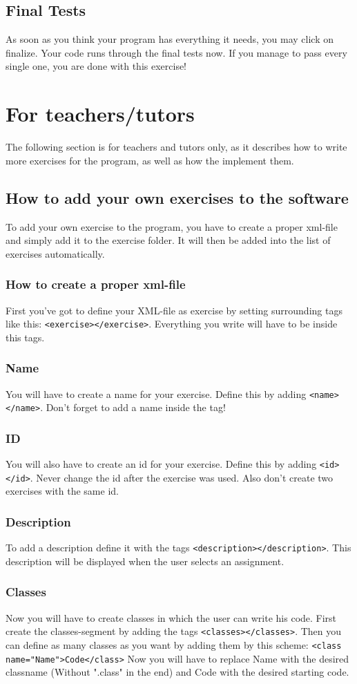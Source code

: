 \documentclass[10pt,a4paper]{article}
\begin{document}
\subsection{Final Tests}
As soon as you think your program has everything it needs, you may click on finalize. Your code runs through the final tests now. If you manage to pass every single one, you are done with this exercise!
\section{For teachers/tutors}
The following section is for teachers and tutors only, as it describes how to write more exercises for the program, as well as how the implement them.
\subsection{How to add your own exercises to the software}
To add your own exercise to the program, you have to create a proper xml-file and simply add it to the exercise folder. It will then be added into the list of exercises automatically.
\subsubsection{How to create a proper xml-file}
First you've got to define your XML-file as exercise by setting surrounding tags like this: 
\texttt{<exercise></exercise>}. Everything you write will have to be inside this tags.
\subsubsection{Name}
You will have to create a name for your exercise. Define this by adding \texttt{<name></name>}. Don't forget to add a name inside the tag!
\subsubsection{ID}
You will also have to create an id for your exercise. Define this by adding \texttt{<id></id>}. Never change the id  after the exercise was used. Also don't create two exercises with the same id.
\subsubsection{Description}
To add a description define it with the tags \texttt{<description></description>}. This description will be displayed when the user selects an assignment.
\subsubsection{Classes}
Now you will have to create classes in which the user can write his code. First create the classes-segment by adding the tags \texttt{<classes></classes>}. \newline
Then you can define as many classes as you want by adding them by this scheme: \newline
\texttt{<class name="Name">Code</class>} Now you will have to replace Name with the desired classname (Without ".class" in the end) and Code with the desired starting code.
\end{document}
